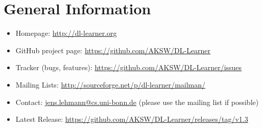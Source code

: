 \documentclass[a4paper,12pt]{scrartcl}
\begin{document}
\section{General Information}
\label{sec:general}
\label{sec:contact}

\begin{itemize}
 \item Homepage: \url{http://dl-learner.org}
 \item GitHub project page: \url{https://github.com/AKSW/DL-Learner}
 \item Tracker (bugs, features): \url{https://github.com/AKSW/DL-Learner/issues}
 \item Mailing Lists: \url{http://sourceforge.net/p/dl-learner/mailman/}
 \item Contact: \href{mailto:jens.lehmann@cs.uni-bonn.de}{jens.lehmann@cs.uni-bonn.de} (please use the mailing list if possible)
 \item Latest Release: \url{https://github.com/AKSW/DL-Learner/releases/tag/v1.3}
\end{itemize}

\nocite{*}


\end{document}
